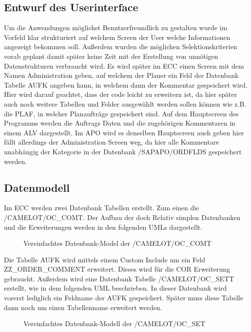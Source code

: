 \subsection{Entwurf des Userinterface}
\label{sec:Benutzeroberflaeche} 
Um die Anwendungen möglichst Benutzerfreundlich zu gestalten wurde im Vorfeld klar strukturiert auf welchem Screen der User welche Informationen angezeigt bekommen soll. Außerdem wurden die möglichen Selektionskriterien vorab geplant damit später keine Zeit mit der Erstellung von unnötigen Datenstrukturen verbraucht wird. Es wird später im \ac{ECC} einen Screen mit dem Namen Administration geben, auf welchem der Planer ein Feld der Datenbank Tabelle AUFK angeben kann, in welchem dann der Kommentar gespeichert wird. Hier wird darauf geachtet, dass der code leicht zu erweitern ist, da hier später auch noch weitere Tabellen und Felder ausgewählt werden sollen können wie z.B. die PLAF, in welcher Planaufträge gespeichert sind. Auf dem Hauptscreen des Programms werden die Auftrags Daten und die zugehörigen Kommentaren in einem \ac{ALV} dargestellt. Im \ac{APO} wird es denselben Hauptscreen auch geben hier fällt allerdings der Administration Screen weg, da hier alle Kommentare unabhängig der Kategorie in der Datenbank /SAPAPO/ORDFLDS gespeichert werden. 

\subsection{Datenmodell}
\label{sec:Datenmodell}
Im ECC werden zwei Datenbank Tabellen erstellt. Zum einen die /CAMELOT/OC\_COMT. Der Aufbau der doch Relativ simplen Datenbanken und die Erweiterungen werden in den folgenden \ac{UML}s dargestellt.

\begin{figure}[htb]
\centering
{}
\caption{Vereinfachtes Datenbank-Model der /CAMELOT/OC\_COMT}
\label{fig:ECC01}
\end{figure} 

Die Tabelle AUFK wird mittels einem Custom Include um ein Feld ZZ\_ORDER\_COMMENT erweitert. Dieses wird für die COR Erweiterung gebraucht. Außerdem wird eine Datenbank Tabelle /CAMELOT/OC\_SETT erstellt, wie in dem folgenden \ac{UML} beschrieben. In dieser Datenbank wird vorerst lediglich ein Feldname der AUFK gespeichert. Später muss diese Tabelle dann noch um einen Tabellenname erweitert werden.

\begin{figure}[htb]
	\centering
	\caption{Vereinfachtes Datenbank-Modell der /CAMELOT/OC\_SET}
	\label{fig:ECC02}
\end{figure} 

